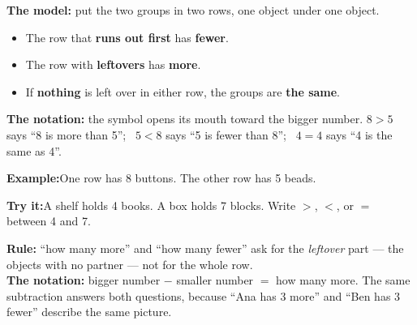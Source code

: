 \documentclass[12pt]{article}
\begin{document}


\begin{formulabox}
\textbf{The model:} put the two groups in two rows, one object under one object.
\begin{itemize}[leftmargin=0.8cm, itemsep=0pt, topsep=1pt]
  \item The row that \textbf{runs out first} has \textbf{fewer}.
  \item The row with \textbf{leftovers} has \textbf{more}.
  \item If \textbf{nothing} is left over in either row, the groups are \textbf{the same}.
\end{itemize}
\textbf{The notation:} the symbol opens its mouth toward the bigger number.
$8 > 5$ says ``8 is more than 5''; \ $5 < 8$ says ``5 is fewer than 8''; \
$4 = 4$ says ``4 is the same as 4''.
\end{formulabox}

\begin{examplebox}
\textbf{Example:}\quad One row has 8 buttons. The other row has 5 beads.
\end{examplebox}

\begin{tryitbox}
\textbf{Try it:}\quad A shelf holds 4 books. A box holds 7 blocks.
Write $>$, $<$, or $=$ between 4 and 7.\\[2pt]
\end{tryitbox}


\begin{formulabox}
\textbf{Rule:} ``how many more'' and ``how many fewer'' ask for the \emph{leftover}
part --- the objects with no partner --- not for the whole row.\\[3pt]
\textbf{The notation:} bigger number $-$ smaller number $=$ how many more.
The same subtraction answers both questions, because ``Ana has 3 more'' and
``Ben has 3 fewer'' describe the same picture.
\end{formulabox}
\end{document}
